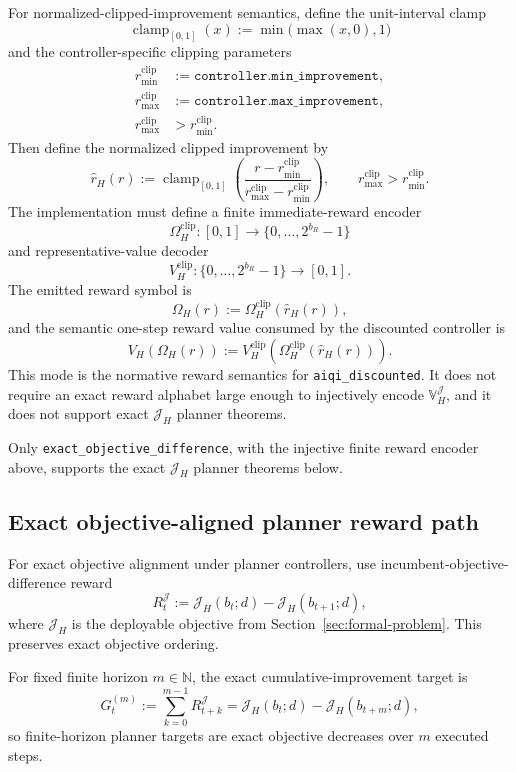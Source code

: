 \documentclass[11pt]{article}
\begin{document}
For normalized-clipped-improvement semantics, define the unit-interval clamp
\[
\operatorname{clamp}_{[0,1]}(x):=\min\!\bigl(\max(x,0),1\bigr)
\]
and the controller-specific clipping parameters
\[
\begin{aligned}
r_{\min}^{\mathrm{clip}}&:=\texttt{controller.min\_improvement},\\
r_{\max}^{\mathrm{clip}}&:=\texttt{controller.max\_improvement},\\
r_{\max}^{\mathrm{clip}}&>r_{\min}^{\mathrm{clip}}.
\end{aligned}
\]
Then define the normalized clipped improvement by
\[
\widehat r_H(r)
:=
\operatorname{clamp}_{[0,1]}
\left(
\frac{r-r_{\min}^{\mathrm{clip}}}{r_{\max}^{\mathrm{clip}}-r_{\min}^{\mathrm{clip}}}
\right),
\qquad r_{\max}^{\mathrm{clip}}>r_{\min}^{\mathrm{clip}}.
\]
The implementation must define a finite immediate-reward encoder
\[
\Omega_H^{\mathrm{clip}}:[0,1]\to\{0,\dots,2^{b_R}-1\}
\]
and representative-value decoder
\[
V_H^{\mathrm{clip}}:\{0,\dots,2^{b_R}-1\}\to[0,1].
\]
The emitted reward symbol is
\[
\Omega_H(r):=\Omega_H^{\mathrm{clip}}(\widehat r_H(r)),
\]
and the semantic one-step reward value consumed by the discounted controller is
\[
V_H(\Omega_H(r))
:=
V_H^{\mathrm{clip}}\!\left(\Omega_H^{\mathrm{clip}}(\widehat r_H(r))\right).
\]
This mode is the normative reward semantics for
\texttt{aiqi\_discounted}. It does not require an exact reward alphabet large
enough to injectively encode $\mathbb{V}_H^{\mathcal J}$, and it does not
support exact $\mathcal{J}_H$ planner theorems.

Only \texttt{exact\_objective\_difference}, with the injective finite reward
encoder above, supports the exact $\mathcal{J}_H$ planner theorems below.

\subsection{Exact objective-aligned planner reward path}

For exact objective alignment under planner controllers, use
incumbent-objective-difference reward
\[
R_t^{\mathcal{J}}:=\mathcal{J}_H(b_t;d)-\mathcal{J}_H(b_{t+1};d),
\]
where $\mathcal{J}_H$ is the deployable objective from
Section~\ref{sec:formal-problem}. This preserves exact objective ordering.

For fixed finite horizon $m\in\mathbb{N}$, the exact cumulative-improvement
target is
\[
G_t^{(m)}:=\sum_{k=0}^{m-1}R_{t+k}^{\mathcal{J}}
=\mathcal{J}_H(b_t;d)-\mathcal{J}_H(b_{t+m};d),
\]
so finite-horizon planner targets are exact objective decreases over $m$
executed steps.
\end{document}
